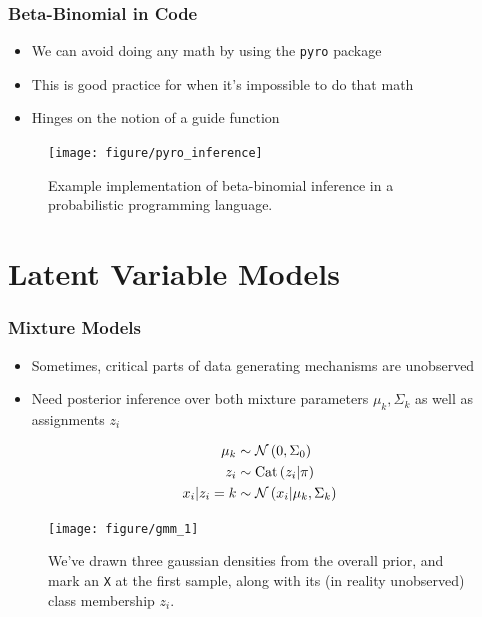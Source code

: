 \documentclass[10pt,mathserif]{beamer}
\begin{document}
\begin{frame}
  \frametitle{Beta-Binomial in Code}
  \begin{itemize}
  \item We can avoid doing any math by using the \texttt{pyro} package
  \item This is good practice for when it's impossible to do that math
  \item Hinges on the notion of a guide function
  \end{itemize}
  \begin{figure}[ht]
    \centering
    \texttt{[image: figure/pyro\_inference]}
    \caption{Example implementation of beta-binomial inference in a
      probabilistic programming language. \label{fig:pyro_inference} }
\end{figure}
\end{frame}

\section{Latent Variable Models}
\label{sec:latent_variable_models}
\begin{frame}
  \frametitle{Mixture Models}
  \begin{itemize}
  \item Sometimes, critical parts of data generating mechanisms are unobserved
    \item Need posterior inference over both mixture parameters $\mu_k,
      \Sigma_k$ as well as assignments $z_i$
  \end{itemize}
  \begin{align*}
    \mu_{k} &\sim \mathcal{N}\left(0, \Sigma_{0}\right) \\
    z_i &\sim \textnormal{Cat}\left(z_i \vert \pi\right) \\
    x_i \vert z_i = k &\sim \mathcal{N}\left(x_i \vert \mu_{k}, \Sigma_k\right)
  \end{align*}
\begin{figure}[ht]
  \centering
  \texttt{[image: figure/gmm\_1]}
  \caption{We've drawn three gaussian densities from the overall prior, and mark
    an \texttt{X} at the first sample, along with its (in reality unobserved)
    class membership $z_i$. \label{fig:gmm_1} }
\end{figure}
\end{frame}
\end{document}
